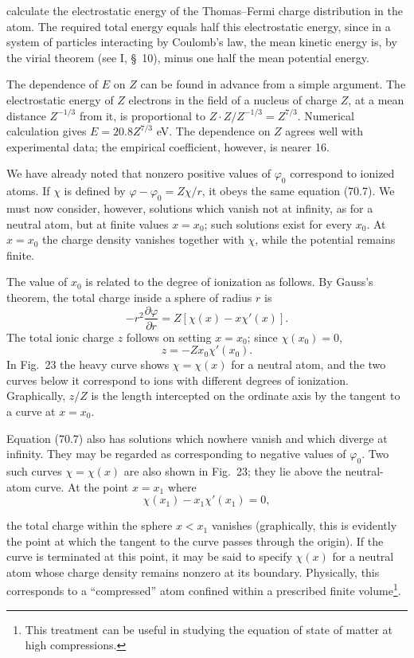 calculate the electrostatic energy of the Thomas--Fermi charge distribution in the atom. The required total energy equals half this electrostatic energy, since in a system of particles interacting by Coulomb's law, the mean kinetic energy is, by the virial theorem (see I, \S~10), minus one half the mean potential energy.

The dependence of $E$ on $Z$ can be found in advance from a simple argument. The electrostatic energy of $Z$ electrons in the field of a nucleus of charge $Z$, at a mean distance $Z^{-1/3}$ from it, is proportional to $Z\cdot Z/Z^{-1/3}=Z^{7/3}$. Numerical calculation gives $E=20.8Z^{7/3}$ eV. The dependence on $Z$ agrees well with experimental data; the empirical coefficient, however, is nearer 16.

We have already noted that nonzero positive values of $\varphi_0$ correspond to ionized atoms. If $\chi$ is defined by $\varphi-\varphi_0=Z\chi/r$, it obeys the same equation (70.7). We must now consider, however, solutions which vanish not at infinity, as for a neutral atom, but at finite values $x=x_0$; such solutions exist for every $x_0$. At $x=x_0$ the charge density vanishes together with $\chi$, while the potential remains finite.

The value of $x_0$ is related to the degree of ionization as follows. By Gauss's theorem, the total charge inside a sphere of radius $r$ is
\[
 -r^2\frac{\partial\varphi}{\partial r}=Z[\chi(x)-x\chi'(x)].
\]
The total ionic charge $z$ follows on setting $x=x_0$; since $\chi(x_0)=0$,
\begin{equation}z=-Zx_0\chi'(x_0).\tag{70.10}\end{equation}
In Fig.~23 the heavy curve shows $\chi=\chi(x)$ for a neutral atom, and the two curves below it correspond to ions with different degrees of ionization. Graphically, $z/Z$ is the length intercepted on the ordinate axis by the tangent to a curve at $x=x_0$.

Equation (70.7) also has solutions which nowhere vanish and which diverge at infinity. They may be regarded as corresponding to negative values of $\varphi_0$. Two such curves $\chi=\chi(x)$ are also shown in Fig.~23; they lie above the neutral-atom curve. At the point $x=x_1$ where
\begin{equation}\chi(x_1)-x_1\chi'(x_1)=0,\tag{70.11}\end{equation}

the total charge within the sphere $x<x_1$ vanishes (graphically, this is evidently the point at which the tangent to the curve passes through the origin). If the curve is terminated at this point, it may be said to specify $\chi(x)$ for a neutral atom whose charge density remains nonzero at its boundary. Physically, this corresponds to a ``compressed'' atom confined within a prescribed finite volume\footnote{This treatment can be useful in studying the equation of state of matter at high compressions.}.

